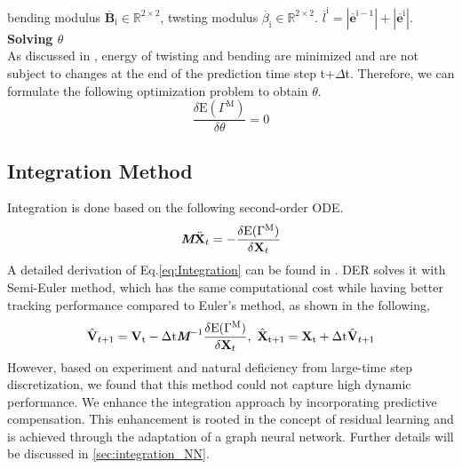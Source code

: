bending modulus $\overline{\textbf{B}}_\text{i} \in \mathbb{R}^{2 \times 2}$, twsting modulus $\overline{\beta}_\text{i} \in \mathbb{R}^{2 \times 2}$. $\overline{\textit{l}}^\text{i} = |\overline{\textbf{e}}^{\text{i}-1}| + |\overline{\textbf{e}}^{\text{i}}|$. \\
\textbf{Solving $\theta$} \\
As discussed in \cite{originalDER}, energy of twisting and bending are minimized and are not subject to changes at the end of the prediction time step t+$\Delta$t. Therefore, we can formulate the following optimization problem to obtain $\theta$.
\begin{equation}
    \frac{\delta \text{E}(\Gamma^\text{M})}{\delta \theta} = 0
    \label{eq:theta_minimize}
\end{equation}

\subsection{Integration Method}
Integration is done based on the following second-order ODE.
\begin{equation}
       \textit{\textbf{M}}\ddot{\textbf{X}}_{t} = -\frac{\delta \text{E}(\Gamma^\text{M})}{\delta \textbf{X}_{t}}
       \label{eq:Integration}
\end{equation}
A detailed derivation of Eq.\ref{eq:Integration} can be found in \cite{originalDER}. DER\cite{originalDER} solves it with Semi-Euler method\cite{implicit-euler}, which has the same computational cost while having better tracking performance compared to Euler's method, as shown in the following, 
\begin{equation}
        \hat{\textbf{V}}_{t+1} = \textbf{V}_\text{t} -\Delta \text{t}\textit{\textbf{M}}^{-1}\frac{\delta \text{E}(\Gamma^\text{M})}{\delta \textbf{X}_{t}}, \, \,  \hat{\textbf{X}}_{\text{t}+1} = \textbf{X}_\text{t} + \Delta \text{t} \hat{\textbf{V}}_{t+1}
       \label{eq:Semi-Euler}
\end{equation}
However, based on experiment and natural deficiency from large-time step discretization, we found that this method could not capture high dynamic performance. We enhance the integration approach by incorporating predictive compensation. This enhancement is rooted in the concept of residual learning and is achieved through the adaptation of a graph neural network. Further details will be discussed in \ref{sec:integration_NN}.
